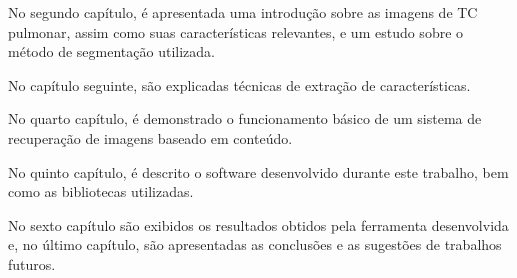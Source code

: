 No segundo capítulo, é apresentada uma introdução sobre as imagens de TC pulmonar, assim como suas características relevantes, e um estudo sobre o método de segmentação utilizada.

No capítulo seguinte, são explicadas técnicas de extração de características.

No quarto capítulo, é demonstrado o funcionamento básico de um sistema de recuperação de imagens baseado em conteúdo.

No quinto capítulo, é descrito o software desenvolvido durante este trabalho, bem como as bibliotecas utilizadas.

No sexto capítulo são exibidos os resultados obtidos pela ferramenta desenvolvida e, no último capítulo, são apresentadas as conclusões e as sugestões de trabalhos futuros.